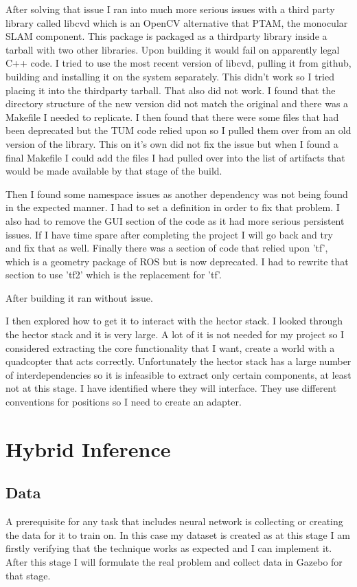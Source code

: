 \documentclass[]{../resources/final_report}
\begin{document}
After solving that issue I ran into much more serious issues with a third party library called 
libcvd which is an OpenCV alternative that PTAM, the monocular SLAM component.
This package is packaged as a thirdparty library inside a tarball with two other libraries.
Upon building it would fail on apparently legal C++ code. I tried to use the most recent version of 
libcvd, pulling it from github, building and installing it on the system separately. This didn't work 
so I tried placing it into the thirdparty tarball. That also did not work. I found that the directory
structure of the new version did not match the original and there was a Makefile I needed to 
replicate. I then found that there were some files that had been deprecated but the TUM code relied 
upon so I pulled them over from an old version of the library. This on it's own did not fix the 
issue but when I found a final Makefile I could add the files I had pulled over into the list of 
artifacts that would be made available by that stage of the build. 

Then I found some namespace issues as another dependency was not being found in the expected manner.
I had to set a definition in order to fix that problem. I also had to remove the GUI section of the 
code as it had more serious persistent issues. If I have time spare after completing the project I 
will go back and try and fix that as well. Finally there was a section of code that relied upon 'tf', 
which is a geometry package of ROS but is now deprecated. I had to rewrite that section to use 'tf2' 
which is the replacement for 'tf'.

After building it ran without issue.

I then explored how to get it to interact with the hector stack. I looked through the hector stack and it is 
very large. A lot of it is not needed for my project so I considered extracting the core functionality
that I want, create a world with a quadcopter that acts correctly. Unfortunately the hector stack 
has a large number of interdependencies so it is infeasible to extract only certain components, at 
least not at this stage. I have identified where they will interface. They use different conventions 
for positions so I need to create an adapter.

\section{Hybrid Inference}

\subsection{Data}
A prerequisite for any task that includes neural network is collecting or creating the data for it 
to train on. In this case my dataset is created as at this stage I am firstly verifying that the 
technique works as expected and I can implement it. After this stage I will formulate the real 
problem and collect data in Gazebo for that stage.
\end{document}
